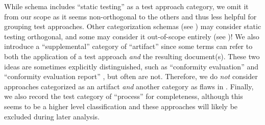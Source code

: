 
While  schema includes ``static testing'' as a test approach
category, we omit it from our scope as it seems non-orthogonal to the others
and thus less helpful for grouping test approaches. \ifnotpaper Other
    categorization schemas (see ) may consider static testing
    orthogonal, and some may consider it out-of-scope entirely (see
    )! \fi We also introduce a ``supplemental'' category of
``artifact'' since some terms can refer to both the
application of a test approach \emph{and} the resulting document(s).
\ifnotpaper
    These two ideas are sometimes explicitly distinguished, such as
    ``conformity evaluation'' and ``conformity evaluation report''
    \citep{ISO_IEC2014}, but often are not.
\fi
Therefore, we do \emph{not} consider approaches categorized as an artifact
\emph{and} another category as flaws in . %
Finally, we also record the test category of ``process'' for completeness,
although this seems to be a higher level classification and these approaches
will likely be excluded during later analysis.

\ifnotpaper
    \begin{landscape}
        \begin{table*}[p]
            \ieeeCatsTable{}
        \end{table*}
    \end{landscape}
\fi


